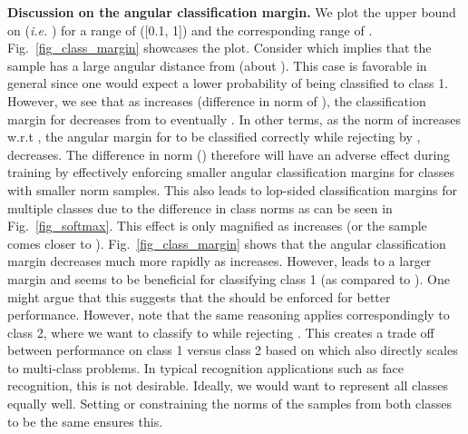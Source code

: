 \documentclass[10pt,twocolumn,letterpaper]{article}
\begin{document}
\textbf{Discussion on the angular classification margin. }  We plot the upper bound on  (\emph{i.e.} ) for a range of  ([0.1, 1]) and the corresponding range of . Fig.~\ref{fig_class_margin} showcases the plot. Consider  which implies that the sample  has a large angular distance from  (about ). This case is favorable in general since one would expect a lower probability of  being classified to class 1. However, we see that as  increases (difference in norm of ), the classification margin for  decreases from  to eventually . In other terms, as the norm of  increases w.r.t , the angular margin for  to be classified correctly while rejecting  by , decreases. The difference in norm () therefore will have an adverse effect during training by effectively enforcing smaller angular classification margins for classes with smaller norm samples. This also leads to lop-sided classification margins for multiple classes due to the difference in class norms as can be seen in Fig.~\ref{fig_softmax}. This effect is only magnified as  increases (or the sample  comes closer to ). Fig.~\ref{fig_class_margin} shows that the angular classification margin decreases much more rapidly as  increases. However,  leads to a larger margin and seems to be beneficial for classifying class 1 (as compared to ). One might argue that this suggests that the  should be enforced for better performance. However, note that the same reasoning applies correspondingly to class 2, where we want to classify  to  while rejecting . This creates a trade off between performance on class 1 versus class 2 based on  which also directly scales to multi-class problems. In typical recognition applications such as face recognition, this is not desirable. Ideally, we would want to represent all classes equally well. Setting  or constraining the norms of the samples from both classes to be the same ensures this.
\end{document}
